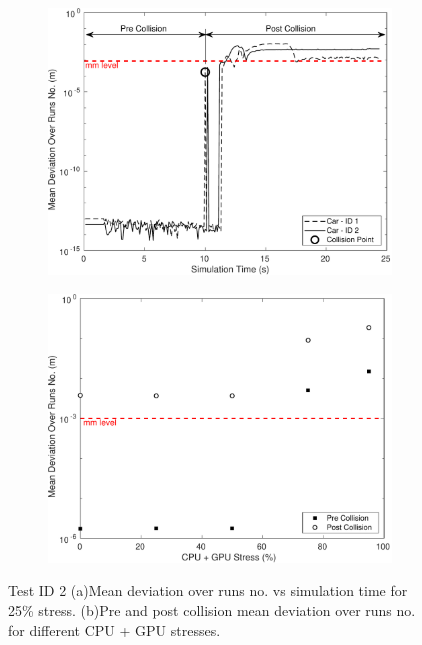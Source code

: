 \begin{figure}[h]
    \centering
    \begin{subfigure}{.49\textwidth}
        \includegraphics[width=1\textwidth]{Other/Figures/CarsCollisionCG25.pdf}
        \caption{}
        \label{CarsCollisionCG25}
    \end{subfigure}
    \begin{subfigure}{.49\textwidth}
        \includegraphics[width=1\textwidth]{Other/Figures/CarsCollisionPrePost.pdf}
        \caption{}
        \label{CarsCollisionPrePost}
    \end{subfigure}
    \caption{Test ID 2 (a)Mean deviation over runs no. vs simulation time for 25\% stress. (b)Pre and post collision mean deviation over runs no. for different CPU + GPU stresses.}
\end{figure}

